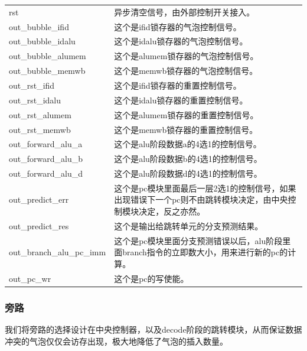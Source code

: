 \begin{center}
\begin{longtable}{p{}p{}}
            rst & 异步清空信号，由外部控制开关接入。\\
            out\_bubble\_ifid & 这个是ifid锁存器的气泡控制信号。\\
            out\_bubble\_idalu & 这个是idalu锁存器的气泡控制信号。\\
            out\_bubble\_alumem & 这个是alumem锁存器的气泡控制信号。\\
            out\_bubble\_memwb & 这个是memwb锁存器的气泡控制信号。\\
            out\_rst\_ifid & 这个是ifid锁存器的重置控制信号。\\
            out\_rst\_idalu & 这个是idalu锁存器的重置控制信号。\\
            out\_rst\_alumem & 这个是alumem锁存器的重置控制信号。\\
            out\_rst\_memwb & 这个是memwb锁存器的重置控制信号。\\
            out\_forward\_alu\_a & 这个是alu阶段数据a的4选1的控制信号。\\
            out\_forward\_alu\_b & 这个是alu阶段数据b的4选1的控制信号。\\
            out\_forward\_alu\_d & 这个是alu阶段数据d的4选1的控制信号。\\
            out\_predict\_err & 这个是pc模块里面最后一层2选1的控制信号，如果出现错误下一个pc则不由跳转模块决定，由中央控制模块决定，反之亦然。\\
            out\_predict\_res & 这个是输出给跳转单元的分支预测结果。\\
            out\_branch\_alu\_pc\_imm & 这个是pc模块里面分支预测错误以后，alu阶段里面branch指令的立即数大小，用来进行新的pc的计算。\\
            out\_pc\_wr & 这个是pc的写使能。\\
        \bottomrule
    \end{longtable}
\end{center}

\subsubsection{旁路}
我们将旁路的选择设计在中央控制器，以及decode阶段的跳转模块，从而保证数据冲突的气泡仅仅会访存出现，极大地降低了气泡的插入数量。

